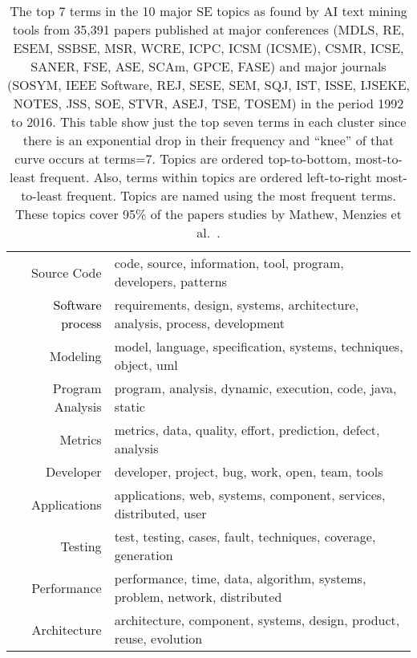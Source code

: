 \begin{table}[!t]

\caption{The top 7 terms in the 10 major SE topics
as found by AI text mining tools from 35,391 papers published at
major  conferences (MDLS, RE, ESEM, SSBSE, MSR, WCRE, ICPC, ICSM (ICSME), CSMR, ICSE, SANER, FSE, ASE, SCAm, GPCE, FASE) and major journals
(SOSYM, IEEE Software, REJ, SESE, SEM, SQJ, IST, ISSE, IJSEKE, NOTES, JSS, SOE, STVR, ASEJ, TSE, TOSEM)
in the period 1992 to 2016.
This table show just the top  seven terms in each cluster since there is an exponential drop in their frequency and ``knee'' of that curve occurs at terms=7. 
Topics are ordered top-to-bottom, most-to-least frequent. Also, terms within topics are ordered left-to-right most-to-least frequent. Topics are 
named using the most frequent terms. These topics cover 95\% of the papers studies by Mathew, Menzies et al.~\cite{Mathew_2018,mathewSoft18}.
}
\label{tbl:11topics}
{\footnotesize
  \begin{center}
\begin{tabular}{r@{~=~}l}\hline
  Source Code & code, source, information, tool, program, developers, patterns \\
  \textcolor{black}{Software process} & requirements, design, systems, architecture, analysis, process, development \\
  Modeling & model, language, specification, systems, techniques, object, uml \\
  Program Analysis & program, analysis, dynamic, execution, code, java, static \\
  Metrics & metrics, data, quality, effort, prediction, defect, analysis \\
  Developer & developer, project, bug, work, open, team, tools \\
  Applications & applications, web, systems,  component,  services, distributed, user \\
  Testing & test, testing, cases, fault, techniques, coverage, generation \\
  Performance & performance, time, data, algorithm, systems,   problem, network, distributed \\
  Architecture & architecture, component, systems, design, product,  reuse, evolution  
   \\\hline

\end{tabular}
\end{center}}
\end{table}